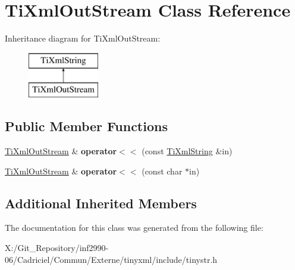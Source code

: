 \hypertarget{class_ti_xml_out_stream}{\section{Ti\-Xml\-Out\-Stream Class Reference}
\label{class_ti_xml_out_stream}
}
Inheritance diagram for Ti\-Xml\-Out\-Stream\-:\begin{figure}[H]
\begin{center}
\leavevmode
\includegraphics[height=2.000000cm]{class_ti_xml_out_stream}
\end{center}
\end{figure}
\subsection*{Public Member Functions}
\begin{DoxyCompactItemize}
\item 
\hypertarget{class_ti_xml_out_stream_a3640dcb1c0903be3bc6966cdc9a79db6}{\hyperlink{class_ti_xml_out_stream}{Ti\-Xml\-Out\-Stream} \& {\bfseries operator$<$$<$} (const \hyperlink{class_ti_xml_string}{Ti\-Xml\-String} \&in)}\label{class_ti_xml_out_stream_a3640dcb1c0903be3bc6966cdc9a79db6}

\item 
\hypertarget{class_ti_xml_out_stream_af2117e5a8cbfcb69544804ad2859bfb6}{\hyperlink{class_ti_xml_out_stream}{Ti\-Xml\-Out\-Stream} \& {\bfseries operator$<$$<$} (const char $\ast$in)}\label{class_ti_xml_out_stream_af2117e5a8cbfcb69544804ad2859bfb6}

\end{DoxyCompactItemize}
\subsection*{Additional Inherited Members}


The documentation for this class was generated from the following file\-:\begin{DoxyCompactItemize}
\item 
X\-:/\-Git\-\_\-\-Repository/inf2990-\/06/\-Cadriciel/\-Commun/\-Externe/tinyxml/include/tinystr.\-h\end{DoxyCompactItemize}
